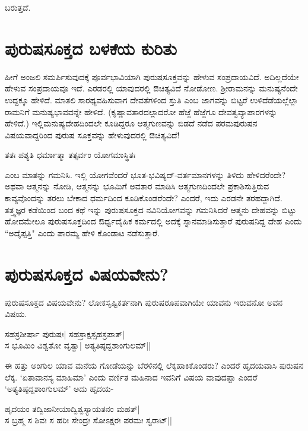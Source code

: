 ಬರುತ್ತದೆ.

\section*{ಪುರುಷಸೂಕ್ತದ ಬಳಕೆಯ ಕುರಿತು}

ಹೀಗೆ ಅಂಜಲಿ ಸಮರ್ಪಿಸುವುದಕ್ಕೆ ಪೂರ್ವಭಾವಿಯಾಗಿ ಪುರುಷಸೂಕ್ತವನ್ನು ಹೇಳುವ ಸಂಪ್ರದಾಯವಿದೆ. ಅದಿಲ್ಲದೆಯೇ ಹೇಳುವ ಸಂಪ್ರದಾಯವೂ ಇದೆ. ಎರಡರಲ್ಲಿ ಯಾವುದರಲ್ಲಿ ಔಚಿತ್ಯವಿದೆ ನೋಡೋಣ. ಶ್ರೀರಾಮನನ್ನು ಮನುಷ್ಯನೆಂದೇ ಉದ್ದಕ್ಕೂ ಹೇಳಿದೆ. ಮಾತಲಿ ಸಾರಥ್ಯವಹಿಸುವಾಗ ದೇವತೆಗಳಿಂದ ಸ್ತುತಿ ಎಂಬ ಜಾಗವನ್ನು ಬಿಟ್ಟರೆ ಉಳಿದೆಡೆಯಲ್ಲೆಲ್ಲಾ ರಾಮನಿಗೆ ಮನುಷ್ಯಭಾವವನ್ನೇ ಹೇಳಿದೆ. (ಕೃಷ್ಣಾವತಾರದಲ್ಲಾದರೋ ಹೆಜ್ಜೆ ಹೆಜ್ಜೆಗೂ ದೇವತ್ವವ್ಯಾಪಾರಗಳನ್ನು ಹೇಳಿದೆ.) ಇಲ್ಲಿಮನುಷ್ಯದೇಹದಿಂದಲೇ ಕೂಡಿದ್ದರೂ ಆತ್ಮಗುಣವನ್ನು ಬಿಡದೆ ನಡೆದ ಪರಮಪುರುಷನ ವಿಷಯವಾದ್ದರಿಂದ ಪುರುಷ ಸೂಕ್ತವನ್ನು ಹೇಳುವುದರಲ್ಲಿ ಔಚಿತ್ಯವಿದೆ!

\begin{shloka}
ತತಃ ಪಶ್ಯತಿ ಧರ್ಮಾತ್ಮಾ ತತ್ಸರ್ವಂ ಯೋಗಮಾಸ್ಥಿತಃ\label{248}
\end{shloka}

ಎಂಬ ಮಾತನ್ನು ಗಮನಿಸಿ. ಇಲ್ಲಿ ಯೋಗವೆಂದರೆ ಭೂತ-ಭವಿಷ್ಯದ್-ವರ್ತಮಾನಗಳನ್ನು ತಿಳಿದು ಹೇಳಿದರೆಂದೇ? ಅಥವಾ ಆತ್ಮನನ್ನು ನೋಡಿ, ಆತ್ಮನನ್ನು ಭೂಮಿಗೆ ಅವತಾರ ಮಾಡಿಸಿ ಆತ್ಮಗುಣದಿಂದಲೇ ಪ್ರಕಾಶಿಸುತ್ತಿರುವ ಕಾವ್ಯವೊಂದನ್ನು ತರಲು ಬೇಕಾದ ಧರ್ಮದಿಂದ ಕೂಡಿಕೊಂಡರೆಂದೇ? ಎಂದರೆ, ಇದು ಎರಡನೇ ತರಹದ್ದಾಗಿದೆ. ತತ್ತ್ವಜ್ಞರ ಕಡೆಯಿಂದ ಬಂದ ಕಥೆ ಇನ್ನು ಪುರುಷಸೂಕ್ತದ ನವಿನಿಯೋಗವನ್ನು ಗಮನಿಸಿದರೆ ಆತ್ಮನು ದೇಹವನ್ನು ಬಿಟ್ಟು ಹೋದಮೇಲೂ ಪುರುಷಸೂಕ್ತದಿಂದ ಔರ್ಧ್ವದೈಹಿಕ ಕರ್ಮದಲ್ಲಿ ಅದಕ್ಕೆ ಸ್ನಾನಮಾಡಿಸುತ್ತಾರೆ ಪುರುಷನಿದ್ದ ದೇಹ ಎಂದು ``ಅದೈಪ್ಪತ್ತಿ" ಎಂದು ಪಾರಮ್ಯ ಹೇಳಿ ಕೊಂಡಾಟ ನಡೆಸುತ್ತಾರೆ. 

\section*{ಪುರುಷಸೂಕ್ತದ ವಿಷಯವೇನು?}

ಪುರುಷಸೂಕ್ತದ ವಿಷಯವೇನು? ಲೋಕಸೃಷ್ಟಿಕರ್ತನಾಗಿ ಪುರುಷರೂಪವಾಗಿಯೇ ಯಾವನು ಇರುವನೋ ಅವನ ವಿಷಯ. 

\begin{shloka}
ಸಹಸ್ರಶೀರ್ಷಾ ಪುರುಷಃ| ಸಹಸ್ರಾಕ್ಷಸ್ಸಹಸ್ರಪಾತ್|\label{249d}\\
ಸ ಭೂಮಿಂ ವಿಶ್ವತೋ ವೃತ್ವಾ| ಅತ್ಯತಿಷ್ಠದ್ದಶಾಂಗುಲಮ್||
\end{shloka}

ಈ ಹತ್ತು ಅಂಗುಲ ಯಾವ ಮನೆಯ ಗೋಡೆಯನ್ನು ಬೆರಳಿನಲ್ಲಿ ಲೆಕ್ಕಹಾಕಿಕೊಂಡರು? ಎಂದರೆ ಹೃದಯವಾಸಿ ಪುರುಷನ ಲೆಕ್ಕ. `ಏತಾವಾನಸ್ಯ ಮಾಹಿಮಾ'\label{249f} ಎಂದು ವರ್ಣಿತ ಮಹಿನಾದ ಇವನಿಗೆ ವಿಷಯ ವಾವುದಪ್ಪಾ ಎಂದರೆ `ಅತ್ಯತಿಷ್ಠದ್ದಶಾಂಗುಲಮ್' ಅದು ಹೃದಯ-

\begin{shloka}
ಹೃದಯಂ ತದ್ವಿಜಾನೀಯಾದ್ವಿಶ್ವಸ್ಯಾಯತನಂ ಮಹತ್|\label{249e}\\
ಸ ಬ್ರಹ್ಮ ಸ ಶಿವಃ ಸ ಹರಿಃ ಸೇಂದ್ರಃ ಸೋಽಕ್ಷರಃ ಪರಮಃ ಸ್ವರಾಟ್||\label{249c}
\end{shloka}

